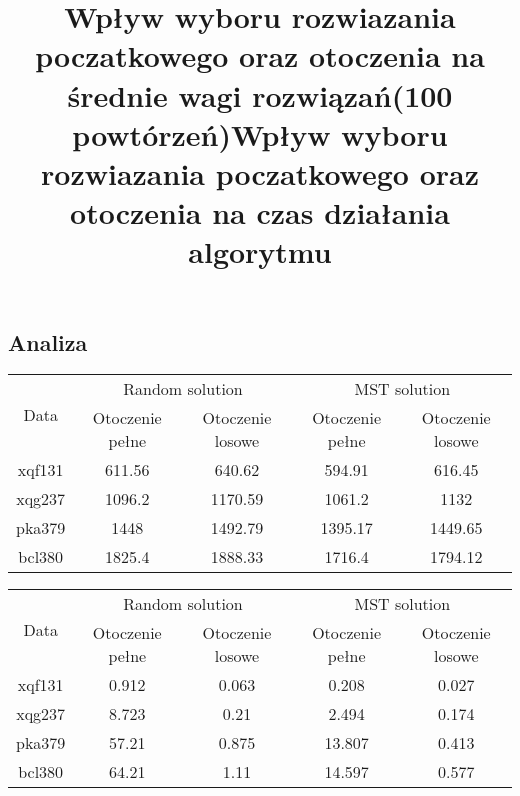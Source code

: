 \documentclass{article}
\begin{document}
\subsection{Analiza}

\newpage
\vspace{10pt}
\begin{center}
    \title{Wpływ wyboru rozwiazania poczatkowego oraz otoczenia na średnie wagi rozwiązań(100 powtórzeń)}
\end{center}

\begin{center}
    \begin{table}[h!]
        \centering
        \begin{tabular}{|c|c|c|c|c|}
            \hline 
            \multirow{2}{*}{Data} & \multicolumn{2}{|c|}{Random solution} & \multicolumn{2}{|c|}{MST solution} \\
            \cline{2-5} & Otoczenie pełne & Otoczenie losowe & Otoczenie pełne & Otoczenie losowe \\
            \hline
            xqf131 & 611.56 & 640.62 & 594.91 & 616.45 \\
            \hline
            xqg237 & 1096.2 & 1170.59 & 1061.2 & 1132 \\
            \hline
            pka379 & 1448 & 1492.79 & 1395.17 & 1449.65 \\
            \hline
            bcl380 & 1825.4 & 1888.33 & 1716.4 & 1794.12 \\
            \hline
        \end{tabular}
    \end{table}
\end{center}
\vspace{10pt}

\begin{center}
    \title{Wpływ wyboru rozwiazania poczatkowego oraz otoczenia na czas działania algorytmu}
\end{center}


\begin{center}
    \begin{table}[h!]
        \centering
        \begin{tabular}{|c|c|c|c|c|}
            \hline 
            \multirow{2}{*}{Data} & \multicolumn{2}{|c|}{Random solution} & \multicolumn{2}{|c|}{MST solution} \\
            \cline{2-5}
            \cline{2-5} & Otoczenie pełne & Otoczenie losowe & Otoczenie pełne & Otoczenie losowe \\
            \hline
            xqf131 & 0.912 & 0.063 & 0.208 & 0.027 \\
            \hline
            xqg237 & 8.723 & 0.21 & 2.494 & 0.174 \\
            \hline
            pka379 & 57.21 & 0.875 & 13.807 & 0.413 \\
            \hline
            bcl380 & 64.21 & 1.11 & 14.597 & 0.577 \\
            \hline
        \end{tabular}
    \end{table}
\end{center}
\end{document}
